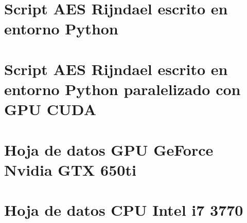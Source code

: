 \documentclass[../main/main.tex]{subfiles}
\begin{document}
\espacio

\section{Script AES Rijndael escrito en entorno Python}\label{anexo:script_aes_original}\hfill


\clearpage

\section{Script AES Rijndael escrito en entorno Python paralelizado con GPU CUDA}\label{anexo:script_aes_modificado}\hfill


\clearpage

\section{Hoja de datos GPU GeForce Nvidia GTX 650ti}\label{anexo:gtx_650ti_datasheet}\hfill


\clearpage

\section{Hoja de datos CPU Intel i7 3770}\label{anexo:i7_3770_datasheet}\hfill

\end{document}
